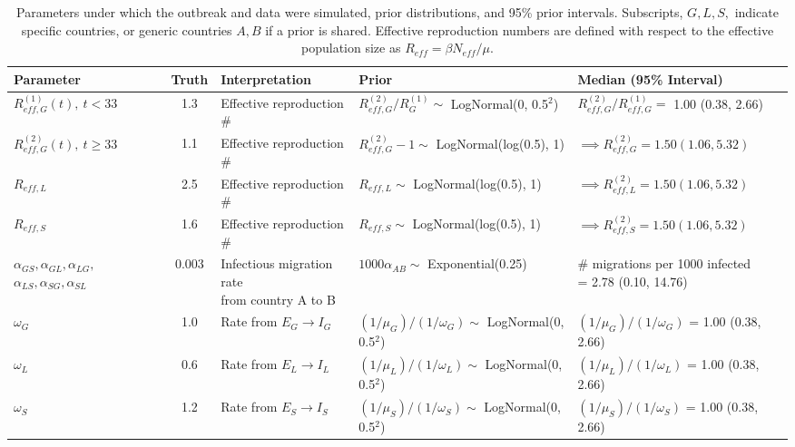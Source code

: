 \begin{table}
	\begin{fullpage}
		\caption[Parameters and priors for a simulated Ebola outbreak in West Africa.]{Parameters under which the outbreak and data were simulated, prior distributions, and 95\% prior intervals. Subscripts, $ G,L,S, $ indicate specific countries, or generic countries $ A,B $ if a prior is shared. Effective reproduction numbers are defined with respect to the effective population size as $ R_{eff} = \beta N_{eff} /\mu $.}
		\label{tab:ebola_synth_pars}
		\scriptsize
	\centering
	\begin{tabular}{lclll}
		\hline
		\textbf{Parameter} & \textbf{Truth} & \textbf{Interpretation} & \textbf{Prior} & \textbf{Median (95\% Interval)} \\ \hline
		$ R_{eff,G}^{(1)}(t),\ t<33 $ & 1.3 & Effective reproduction \#  & $ R_{eff,G}^{(2)} / R_G^{(1)}\sim $ LogNormal(0, 0.5$ ^2 $) & $ R_{eff,G}^{(2)} / R_{eff,G}^{(1)} = $ 1.00 (0.38, 2.66) \\
		$ R_{eff,G}^{(2)}(t),\ t\geq33 $ & 1.1 & Effective reproduction \# & $ R_{eff,G}^{(2)}-1\sim $ LogNormal(log(0.5), 1) & $ \implies R_{eff,G}^{(2)} = 1.50 (1.06, 5.32)$ \\
		$ R_{eff,L} $ & 2.5 & Effective reproduction \# & $ R_{eff,L}\sim $ LogNormal(log(0.5), 1) & $ \implies R_{eff,L}^{(2)} = 1.50 (1.06, 5.32)$ \\
		$ R_{eff,S} $ & 1.6 & Effective reproduction \# & $ R_{eff,S}\sim $ LogNormal(log(0.5), 1) & $ \implies R_{eff,S}^{(2)} = 1.50 (1.06, 5.32)$ \\
		\makecell[l]{$ \alpha_{GS},\alpha_{GL}, \alpha_{LG},$\\
		$ \alpha_{LS},\alpha_{SG}, \alpha_{SL} $} & 0.003 & \makecell[l]{Infectious migration rate \\ from country A to B} & $ 1000\alpha_{AB} \sim$ Exponential(0.25) & \makecell[l]{\# migrations per 1000 infected \\ = 2.78 (0.10, 14.76)}\\ 
		$ \omega_G $ & 1.0 & Rate from $ E_G\rightarrow I_G $ & $ (1/\mu_G)\big/(1/\omega_G) \sim $ LogNormal(0, 0.5$ ^2 $) & $ (1/\mu_G)\big/(1/\omega_G) $ = 1.00 (0.38, 2.66) \\
		$ \omega_L $ & 0.6 & Rate from $ E_L\rightarrow I_L $ & $ (1/\mu_L)\big/(1/\omega_L) \sim $ LogNormal(0, 0.5$ ^2 $) & $ (1/\mu_L)\big/(1/\omega_L) $ = 1.00 (0.38, 2.66) \\
		$ \omega_S $ & 1.2 & Rate from $ E_S\rightarrow I_S $ & $ (1/\mu_S)\big/(1/\omega_S) \sim $ LogNormal(0, 0.5$ ^2 $) & $ (1/\mu_S)\big/(1/\omega_S) $ = 1.00 (0.38, 2.66) \\

\end{tabular}
\end{fullpage}
\end{table}
